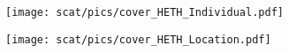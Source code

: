 
\begin{frame}
\begin{center}
\texttt{[image: scat/pics/cover\_HETH\_Individual.pdf]}
\end{center}
\end{frame}



\begin{frame}
\begin{center}
\texttt{[image: scat/pics/cover\_HETH\_Location.pdf]}
\end{center}
\end{frame}


